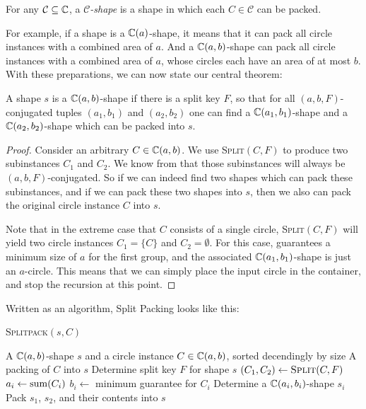 \documentclass[a4paper,style=print,bibliography=totoc,nexus,lnum,extramargin]{tubsbook}
\begin{document}
\begin{definition}
    For any $\mathcal{C} \subseteq \mathbb{C}$, a \emph{$\mathcal{C}$-shape} is a shape in which each $C \in \mathcal{C}$ can be packed.
\end{definition}

For example, if a shape is a $\mathbb{C}(a)$-shape, it means that it can pack all circle instances with a combined area of $a$. And a $\mathbb{C}(a,b)$-shape can pack all circle instances with a combined area of $a$, whose circles each have an area of at most $b$.
With these preparations, we can now state our central theorem:

\begin{theorem}\label{th:split-packing}
    A shape $s$ is a $\mathbb{C}(a,b)$-shape if there is a split key $F$, so that for all $(a,b,F)$-conjugated tuples $(a_1, b_1)$ and $(a_2, b_2)$ one can find a $\mathbb{C}(a_1, b_1)$-shape and a $\mathbb{C}(a_2, b_2)$-shape which can be packed into $s$.
\end{theorem}

\begin{proof}
    Consider an arbitrary $C \in \mathbb{C}(a,b)$.
    We use \textsc{Split}$(C,F)$ to produce two subinstances $C_1$ and $C_2$. We know from  that those subinstances will always be $(a,b,F)$-conjugated. So if we can indeed find two shapes which can pack these subinstances, and if we can pack these two shapes into $s$, then we also can pack the original circle instance $C$ into $s$.

Note that in the extreme case that $C$ consists of a single circle, \textsc{Split}$(C,F)$ will yield two circle instances $C_1 = \{C\}$ and $C_2 = \emptyset$. For this case,  guarantees a minimum size of $a$ for the first group, and the associated $\mathbb{C}(a_1,b_1)$-shape is just an $a$-circle. This means that we can simply place the input circle in the container, and stop the recursion at this point.
\end{proof}

Written as an algorithm, Split Packing looks like this:

\begin{algorithm}
    \caption{\textsc{Splitpack}$(s,C)$}
    \begin{algorithmic}
        \Require A $\mathbb{C}(a,b)$-shape $s$ and a circle instance $C \in \mathbb{C}(a,b)$, sorted decendingly by size
        \Ensure A packing of $C$ into $s$
        \State Determine split key $F$ for shape $s$
        \State $(C_1, C_2) \gets \textsc{Split}(C,F)$ 
            \State $a_i \gets \operatorname{sum}(C_i)$
            \State $b_i \gets$ minimum guarantee for $C_i$ 
            \State Determine a $\mathbb{C}(a_i, b_i)$-shape $s_i$
            \State {}
        \EndFor
        \State Pack $s_1$, $s_2$, and their contents into $s$
    \end{algorithmic}
\end{algorithm}
\end{document}

